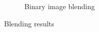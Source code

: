 \begin{figure}[h!]
\begin{subfigure}{0.7\textwidth}
  \caption{Binary image blending}
  \label{fig:blending-d}
\end{subfigure}%
 \caption{Blending results}
\label{fig:blending}

\end{figure}




